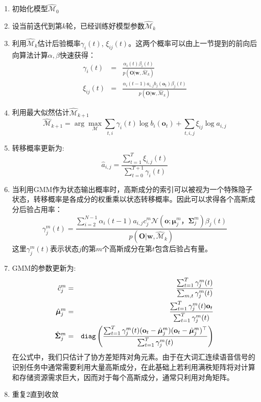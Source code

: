 \begin{enumerate}
    \item 初始化模型$\hat{\mathcal{M}}_0$
    \item 设当前迭代到第$k$轮，已经训练好模型参数$\hat{\mathcal{M}}_k$
    \item 利用$\hat{\mathcal{M}}_k$估计后验概率$\gamma_i(t)$, $\xi_{ij}(t)$。这两个概率可以由上一节提到的前向后向算法计算$\alpha,\beta$快速获得：
    \begin{eqnarray}
    \gamma_i(t)&=&\frac{\alpha_i(t)\beta_i(t)}{p(\mathbf{O}|\mathbf{w}, \hat{\mathcal{M}}_k)} \\
    \xi_{ij}(t)&=&\frac{\alpha_i(t-1)a_{i,j}b_j(\mathbf{o}_t)\beta_j(t)}{p(\mathbf{O}|\mathbf{w}, \hat{\mathcal{M}}_k)}
    \end{eqnarray}
    \item 利用最大似然估计$\hat{\mathcal{M}}_{k+1}$
    \begin{equation}
        \hat{\mathcal{M}}_{k+1} = \arg \max_{\mathcal{M}} \sum_{t,i} \gamma_i(t)\log b_i(\mathbf{o}_t) + \sum_{t,i,j}\xi_{ij}\log a_{i,j}
    \end{equation}
    \item 转移概率更新为:
    \begin{equation}
        \hat{a}_{i,j}=\frac{\sum_{t=1}^T \xi_{i,j}(t)}{\sum_{t=0}^{T+1} \gamma_i(t)}
    \end{equation}
    \item 当利用GMM作为状态输出概率时，高斯成分的索引可以被视为一个特殊隐子状态，转移概率是各成分的权重乘以状态转移概率。因此可以求得各个高斯成分后验占用率：
    \begin{equation}
        \gamma^m_j(t)=\frac{\sum_{i=2}^{N-1}\alpha_i(t-1)a_{i,j}c^m_{j}\mathcal{N}(\mathbf{o}; \bm{\mu}^m_j， \bm{\Sigma}^m_j)\beta_j(t)}{p(\mathbf{O}|\mathbf{w}, \hat{\mathcal{M}}_k)}   
    \end{equation}
    这里$\gamma^m_j(t)$表示状态$j$的第$m$个高斯成分在第$t$包含后验占有量。
    \item GMM的参数更新为:
    \begin{eqnarray}
        \hat{c}^m_j &=& \frac{\sum_{t=1}^T \gamma^m_j(t)}{\sum_{m,t} \gamma^m_j(t)} \\
        \hat{\bm{\mu}}^m_j &=& \frac{\sum_{t=1}^T \gamma^m_j(t) \mathbf{o}_t}{\sum_{t=1}^T \gamma^m_j(t)} \\
        \hat{\bm{\Sigma}}^m_j &=& {\tt diag} \left( \frac{\sum_{t=1}^T \gamma^m_j(t) (\mathbf{o}_t-\hat{\bm{\mu}}^m_j)(\mathbf{o}_t-\hat{\bm{\mu}}^m_j)^{\top}}{\sum_{t=1}^T \gamma^m_j(t)} \right)
    \end{eqnarray}
    在公式中，我们只估计了协方差矩阵对角元素。由于在大词汇连续语音信号的识别任务中通常需要利用大量高斯成分，在此基础上若利用满秩矩阵将对计算和存储资源需求巨大，因而对于每个高斯成分，通常只利用对角矩阵。
    \item 重复2直到收敛
\end{enumerate}

